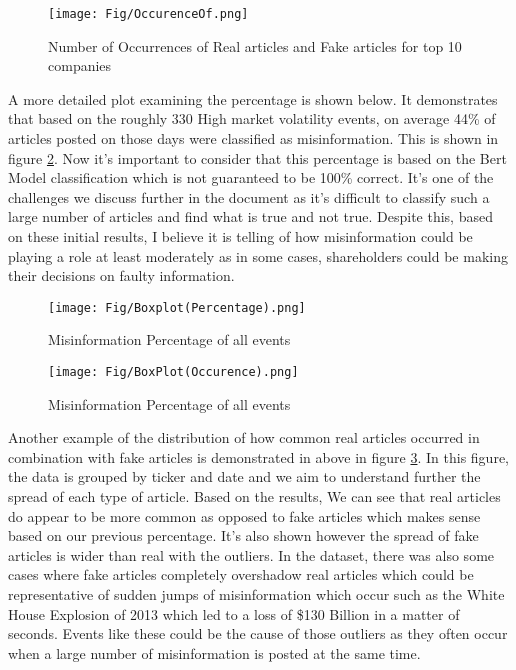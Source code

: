 \documentclass{article}
\begin{document}
\begin{figure}[H]
    \centering
    \texttt{[image: Fig/OccurenceOf.png]}
    \caption{Number of Occurrences of Real articles and Fake articles for top 10 companies}
    \label{fig:Occur1}
\end{figure}

A more detailed plot examining the percentage is shown below. It demonstrates that based on the roughly 330 High market volatility events, on average 44\% of articles posted on those days were classified as misinformation. This is shown in figure \ref{fig:Percent1}. Now it's important to consider that this percentage is based on the Bert Model classification which is not guaranteed to be 100\% correct. It's one of the challenges we discuss further in the document as it's difficult to classify such a large number of articles and find what is true and not true. Despite this, based on these initial results, I believe it is telling of how misinformation could be playing a role at least moderately as in some cases, shareholders could be making their decisions on faulty information. 


\begin{figure}[H]
    \centering
    \texttt{[image: Fig/Boxplot(Percentage).png]}
    \caption{Misinformation Percentage of all events}
    \label{fig:Percent1}
\end{figure}


\begin{figure}[H]
    \centering
    \texttt{[image: Fig/BoxPlot(Occurence).png]}
    \caption{Misinformation Percentage of all events}
    \label{fig:occur2}
\end{figure}

Another example of the distribution of how common real articles occurred in combination with fake articles is demonstrated in above in figure \ref{fig:occur2}. In this figure, the data is grouped by ticker and date and we aim to understand further the spread of each type of article. Based on the results, We can see that real articles do appear to be more common as opposed to fake articles which makes sense based on our previous percentage. It's also shown however the spread of fake articles is wider than real with the outliers. In the dataset, there was also some cases where fake articles completely overshadow real articles which could be representative of sudden jumps of misinformation which occur such as the White House Explosion of 2013 which led to a loss of \$130 Billion in a matter of seconds. \cite{source33, source34} Events like these could be the cause of those outliers as they often occur when a large number of misinformation is posted at the same time. 
\end{document}
